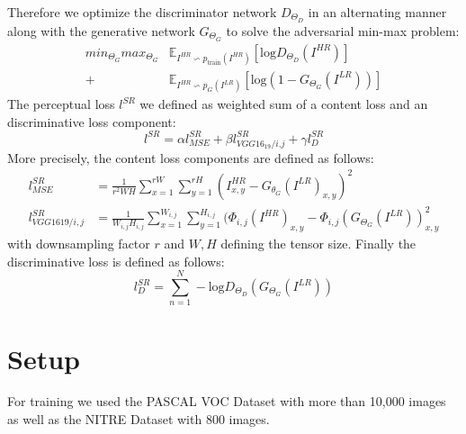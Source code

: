 \documentclass[10pt,twocolumn,letterpaper]{article}
\begin{document}
Therefore we optimize the discriminator network $D_{\Theta_D}$ in an
alternating manner along with the generative network $G_{\Theta_G}$ to
solve the adversarial min-max problem:
\begin{align*}
  min_{\Theta_G} max_{\Theta_G} &\mathbb{E}_{I^{HR} \backsim p_{\text{train}}(I^{HR})} [\text{log} D_{\Theta_D}(I^{HR})] \\
  +&\mathbb{E}_{I^{HR} \backsim p_G(I^{LR})} [\text{log} (1-G_{\Theta_G}(I^{LR}))]
\end{align*}
The perceptual loss $l^{SR}$ we defined as weighted sum of a content loss and an discriminative loss component:
\begin{equation*}
  l^{SR}=\alpha l^{SR}_{MSE} + \beta l^{SR}_{VGG16_19/i.j} + \gamma l^{SR}_{D}
\end{equation*}
More precisely, the content loss components are defined as follows:
\begin{align*}
  l^{SR}_{M SE}       &= \frac{1}{r^2WH}\sum_{x=1}^{rW}\sum_{y=1}^{rH}(I^{HR}_{x,y}-G_{\theta_G}(I^{LR})_{x,y})^2 \\
  l^{SR}_{VGG1619/i,j}&=\frac{1}{W_{i,j}H_{i,j}} \sum_{x=1}^{W_{i,j}}\sum_{y=1}^{H_{i,j}}(\Phi_{i,j}(I^{HR})_{x,y}-\Phi_{i,j}(G_{\Theta_G}(I^{LR}))_{x,y}^2
\end{align*}
with downsampling factor $r$ and $W,H$ defining the tensor size.
Finally the discriminative loss is defined as follows:
\begin{equation*}  
  l^{SR}_{D}=\sum_{n=1}^N -\text{log}D_{\Theta_D}(G_{\Theta_G}(I^{LR}))
\end{equation*}
\section{Setup}
\label{sec:setup}



For training we used the PASCAL VOC Dataset\cite{pascal-voc-2012} with
more than 10,000 images as well as the NITRE
Dataset\cite{Agustsson_2017_CVPR_Workshops} with 800 images.

\end{document}
